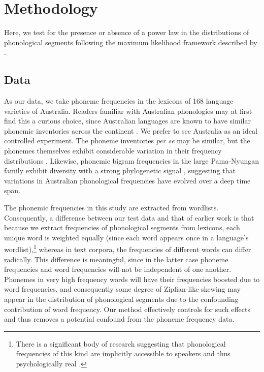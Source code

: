 \hypertarget{methodology}{%
\section{Methodology}\label{methodology}}

Here, we test for the presence or absence of a power law in the distributions of phonological segments following the maximum likelihood framework described by \textcite{clauset_power-law_2009}.

\hypertarget{data}{%
\subsection{Data}\label{data}}

As our data, we take phoneme frequencies in the lexicons of 168 language varieties of Australia. Readers familiar with Australian phonologies may at first find this a curious choice, since Australian languages are known to have similar phonemic inventories across the continent \autocites{capell_new_1956}{dixon_languages_1980}{busby_distribution_1982}{hamilton_phonetic_1996}{baker_word_2014}{round_phonemic_2019}{round_segment_2020}. We prefer to see Australia as an ideal controlled experiment. The phoneme inventories \emph{per se} may be similar, but the phonemes themselves exhibit considerable variation in their frequency distributions \autocites{gasser_revisiting_2014}{macklin-cordes_high-definition_2015}. Likewise, phonemic bigram frequencies in the large Pama-Nyungan family exhibit diversity with a strong phylogenetic signal \autocite{macklin-cordes_phylogenetic_2020}, suggesting that variations in Australian phonological frequencies have evolved over a deep time span.

The phonemic frequencies in this study are extracted from wordlists. Consequently, a difference between our test data and that of earlier work is that because we extract frequencies of phonological segments from lexicons, each unique word is weighted equally (since each word appears once in a language's wordlist),\footnote{There is a significant body of research suggesting that phonological frequencies of this kind are implicitly accessible to speakers and thus psychologically real \autocites[for example,][]{coleman_stochastic_1997}{zuraw_patterned_2000}{ernestus_predicting_2003}{albright_rules_2003}{eddington_spanish_2004}{hayes_stochastic_2006}.} whereas in text corpora, the frequencies of different words can differ radically. This difference is meaningful, since in the latter case phoneme frequencies and word frequencies will not be independent of one another. Phonemes in very high frequency words will have their frequencies boosted due to word frequencies, and consequently some degree of Zipfian-like skewing may appear in the distribution of phonological segments due to the confounding contribution of word frequency. Our method effectively controls for such effects and thus removes a potential confound from the phoneme frequency data.

